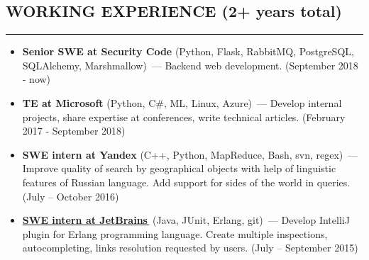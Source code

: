 \documentclass[11pt]{res} %
\let\orighref\href
\renewcommand{\href}[2]{\orighref{#1}{#2\,\faExternalLink}}
\begin{document}
\begin{resume}
\section{\uppercase{Working Experience} (2+ years total)}
\begin{spacing}{0.3}
\textcolor[RGB]{220,220,220}{\rule{\linewidth}{0.4pt}} 
\end{spacing}
\vspace{0.2in}
   \begin{itemize} \itemsep -2pt  %
   \item {\textbf{Senior SWE at Security Code}} (Python, Flask, RabbitMQ, PostgreSQL, SQLAlchemy, Marshmallow)~--- Backend web development. (September 2018 - now)
   \item {\textbf{TE at Microsoft}} (Python, C\#, ML, Linux, Azure)~--- Develop internal projects, share expertise at conferences, write technical articles. (February 2017 - September 2018)
   \item {\textbf{SWE intern at Yandex}} (C++, Python, MapReduce, Bash, svn, regex)~--- Improve quality of search by geographical objects with help of linguistic features of Russian language. Add support for sides of the world in queries. (July – October 2016)
   \item \textbf{\href{https://github.com/ignatov/intellij-erlang/commits?author=telezhnaya}{SWE intern at JetBrains}} (Java, JUnit, Erlang, git)~--- Develop IntelliJ plugin for Erlang programming language. Create multiple inspections, autocompleting, links resolution requested by users. (July – September 2015)
 \end{itemize}


\end{resume}
\end{document}
